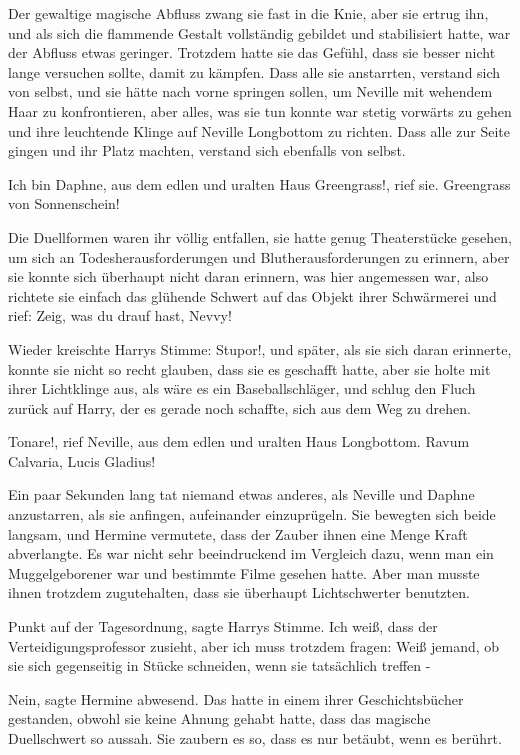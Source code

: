 Der gewaltige magische Abfluss zwang sie fast in die Knie, aber sie ertrug ihn,
und als sich die flammende Gestalt vollständig gebildet und stabilisiert hatte,
war der Abfluss etwas geringer. Trotzdem hatte sie das Gefühl, dass sie besser
nicht lange versuchen sollte, damit zu kämpfen. Dass alle sie anstarrten,
verstand sich von selbst, und sie hätte nach vorne springen sollen, um Neville
mit wehendem Haar zu konfrontieren, aber alles, was sie tun konnte war stetig
vorwärts zu gehen und ihre leuchtende Klinge auf Neville Longbottom zu richten.
Dass alle zur Seite gingen und ihr Platz machten, verstand sich ebenfalls von
selbst.

\glqq{}Ich bin Daphne, aus dem edlen und uralten Haus Greengrass!\grqq{}, rief
sie. \glqq{}Greengrass von Sonnenschein!\grqq{}

Die Duellformen waren ihr völlig entfallen, sie hatte genug Theaterstücke
gesehen, um sich an Todesherausforderungen und Blutherausforderungen zu
erinnern, aber sie konnte sich überhaupt nicht daran erinnern, was hier
angemessen war, also richtete sie einfach das glühende Schwert auf das Objekt
ihrer Schwärmerei und rief: \glqq{}Zeig, was du drauf hast, Nevvy!\grqq{}

Wieder kreischte Harrys Stimme: \glqq{}Stupor!\grqq{}, und später, als sie sich
daran erinnerte, konnte sie nicht so recht glauben, dass sie es geschafft hatte,
aber sie holte mit ihrer Lichtklinge aus, als wäre es ein Baseballschläger, und
schlug den Fluch zurück auf Harry, der es gerade noch schaffte, sich aus dem Weg
zu drehen.

\glqq{}Tonare!\grqq{}, rief Neville, aus dem edlen und uralten Haus Longbottom.
\glqq{}Ravum Calvaria, Lucis Gladius!\grqq{}

Ein paar Sekunden lang tat niemand etwas anderes, als Neville und Daphne
anzustarren, als sie anfingen, aufeinander einzuprügeln. Sie bewegten sich beide
langsam, und Hermine vermutete, dass der Zauber ihnen eine Menge Kraft
abverlangte. Es war nicht sehr beeindruckend im Vergleich dazu, wenn man ein
Muggelgeborener war und bestimmte Filme gesehen hatte. Aber man musste ihnen
trotzdem zugutehalten, dass sie überhaupt Lichtschwerter benutzten.

\glqq{}Punkt auf der Tagesordnung\grqq{}, sagte Harrys Stimme. \glqq{}Ich weiß,
dass der Verteidigungsprofessor zusieht, aber ich muss trotzdem fragen: Weiß
jemand, ob sie sich gegenseitig in Stücke schneiden, wenn sie tatsächlich
treffen -\grqq{}

\glqq{}Nein\grqq{}, sagte Hermine abwesend. Das hatte in einem ihrer
Geschichtsbücher gestanden, obwohl sie keine Ahnung gehabt hatte, dass das
magische Duellschwert so aussah. \glqq{}Sie zaubern es so, dass es nur betäubt,
wenn es berührt.\grqq{}

